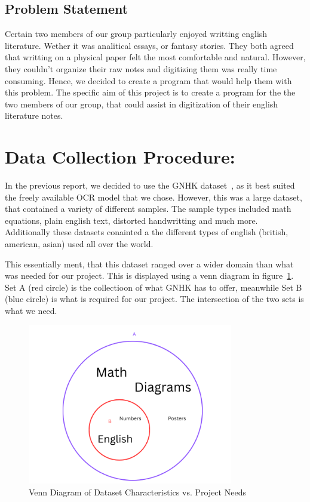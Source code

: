 \documentclass[twoside,a4paper]{article}
\begin{document}
\subsection{Problem Statement}
Certain two members of our group particularly enjoyed writting english literature. Wether it was analitical essays, or fantasy stories. They both agreed that writting on a physical paper felt the most comfortable and natural. However, they couldn't organize their raw notes and digitizing them was 
really time consuming. Hence, we decided to create a program that would help them with this problem. The specific aim of this project is to create a program
for the the two members of our group, that could assist in digitization of their english literature notes.

\section{Data Collection Procedure: }
In the previous report, we decided to use the GNHK dataset~\cite{Lee2021}, as it best suited the freely available OCR model that we chose. However, this was a large dataset, that contained
a variety of different samples. The sample types included math equations, plain english text, distorted handwritting and much more. Additionally these datasets conainted a the different types of english (british, american, asian) used all over the world.

This essentially ment, that this dataset ranged over a wider domain than what was needed for our project. This is displayed using 
a venn diagram in figure~\ref{fig:venn_diagram}. Set A (red circle) is the collectioon of what GNHK has to offer, meanwhile Set B (blue circle) is
what is required for our project. The intersection of the two sets is what we need.
\begin{figure}[H]
  \centering
  \includegraphics[width=0.8\textwidth]{VennDiagram_WhatWeNeed.png}
  \caption{Venn Diagram of Dataset Characteristics vs. Project Needs}
  \label{fig:venn_diagram}
\end{figure}
\end{document}
